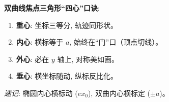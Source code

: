\begin{summarybox}
\textbf{双曲线焦点三角形“四心”口诀}:
\begin{enumerate}
    \item \textbf{重心}: 坐标三等分, 轨迹同形状。
    \item \textbf{内心}: 横标等于 $a$, 始终在“门”口（顶点切线）。
    \item \textbf{外心}: 必在 $y$ 轴上, 对称美如画。
    \item \textbf{垂心}: 横坐标随动, 纵标反比化。
\end{enumerate}
\textit{速记}: 椭圆内心横标动 ($ex_0$), 双曲内心横标定 ($\pm a$)。
\end{summarybox}